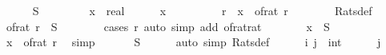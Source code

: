 \begin{isabellebody}
%
\isadelimproof
%
\endisadelimproof
%
\isatagproof
{}\isamarkupfalse%
\isanewline
\ \ \isamarkupfalse%
\ {\isachardoublequoteopen}{\isasymrat}\ {\isasymsubseteq}\ {\isacharquery}{\kern0pt}S{\isachardoublequoteclose}\isanewline
\ \ \isamarkupfalse%
\isanewline
\ \ \ \ \isamarkupfalse%
\ x\ {\isacharcolon}{\kern0pt}{\isacharcolon}{\kern0pt}\ real\isanewline
\ \ \ \ \isamarkupfalse%
\ {\isachardoublequoteopen}x\ {\isasymin}\ {\isasymrat}{\isachardoublequoteclose}\isanewline
\ \ \ \ \isamarkupfalse%
\ \isamarkupfalse%
\ r\ \ {\isachardoublequoteopen}x\ {\isacharequal}{\kern0pt}\ of{\isacharunderscore}{\kern0pt}rat\ r{\isachardoublequoteclose}\isanewline
\ \ \ \ \ \ \isamarkupfalse%
\ Rats{\isacharunderscore}{\kern0pt}def\ \isacommand{{\isachardot}{\kern0pt}{\isachardot}{\kern0pt}}\isamarkupfalse%
\isanewline
\ \ \ \ \isamarkupfalse%
\ {\isachardoublequoteopen}of{\isacharunderscore}{\kern0pt}rat\ r\ {\isasymin}\ {\isacharquery}{\kern0pt}S{\isachardoublequoteclose}\isanewline
\ \ \ \ \ \ \isamarkupfalse%
\ {\isacharparenleft}{\kern0pt}cases\ r{\isacharparenright}{\kern0pt}\ {\isacharparenleft}{\kern0pt}auto\ simp\ add{\isacharcolon}{\kern0pt}\ of{\isacharunderscore}{\kern0pt}rat{\isacharunderscore}{\kern0pt}rat{\isacharparenright}{\kern0pt}\isanewline
\ \ \ \ \isamarkupfalse%
\ \isamarkupfalse%
\ {\isachardoublequoteopen}x\ {\isasymin}\ {\isacharquery}{\kern0pt}S{\isachardoublequoteclose}\isanewline
\ \ \ \ \ \ \isamarkupfalse%
\ {\isacartoucheopen}x\ {\isacharequal}{\kern0pt}\ of{\isacharunderscore}{\kern0pt}rat\ r{\isacartoucheclose}\ \isamarkupfalse%
\ simp\isanewline
\ \ \isamarkupfalse%
\isanewline
{}\isamarkupfalse%
\isanewline
\ \ \isamarkupfalse%
\ {\isachardoublequoteopen}{\isacharquery}{\kern0pt}S\ {\isasymsubseteq}\ {\isasymrat}{\isachardoublequoteclose}\isanewline
\ \ \isamarkupfalse%
\ {\isacharparenleft}{\kern0pt}auto\ simp{\isacharcolon}{\kern0pt}\ Rats{\isacharunderscore}{\kern0pt}def{\isacharparenright}{\kern0pt}\isanewline
\ \ \ \ \isamarkupfalse%
\ i\ j\ {\isacharcolon}{\kern0pt}{\isacharcolon}{\kern0pt}\ int\isanewline
\ \ \ \ \isamarkupfalse%
\ {\isachardoublequoteopen}j\ {\isasymnoteq}\ {}{\isachardoublequoteclose}\isanewline
\ \ \ \ \isamarkupfalse%
\ \isamarkupfalse%

\end{isabellebody}
